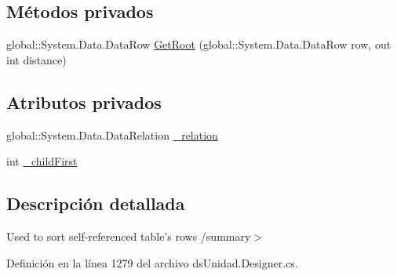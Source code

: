 \subsection*{Métodos privados}
\begin{DoxyCompactItemize}
\item 
global\-::\-System.\-Data.\-Data\-Row \hyperlink{class_proyecto___integrador__3_1_1ds_unidad_table_adapters_1_1_table_adapter_manager_1_1_self_reference_comparer_ad4f17f22d884ae350f82a0213485c822}{Get\-Root} (global\-::\-System.\-Data.\-Data\-Row row, out int distance)
\end{DoxyCompactItemize}
\subsection*{Atributos privados}
\begin{DoxyCompactItemize}
\item 
global\-::\-System.\-Data.\-Data\-Relation \hyperlink{class_proyecto___integrador__3_1_1ds_unidad_table_adapters_1_1_table_adapter_manager_1_1_self_reference_comparer_a38933c9fc07338f9d73c729181d3b020}{\-\_\-relation}
\item 
int \hyperlink{class_proyecto___integrador__3_1_1ds_unidad_table_adapters_1_1_table_adapter_manager_1_1_self_reference_comparer_a2ca072558bfe3bf9c2f599771b6bafc1}{\-\_\-child\-First}
\end{DoxyCompactItemize}


\subsection{Descripción detallada}
Used to sort self-\/referenced table's rows /summary$>$ 

Definición en la línea 1279 del archivo ds\-Unidad.\-Designer.\-cs.



